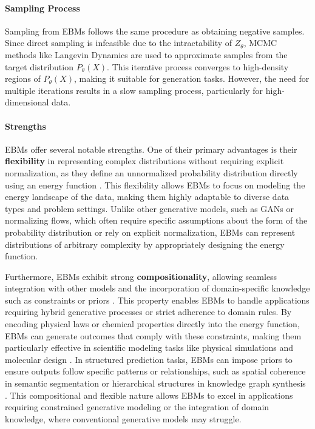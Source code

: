 \paragraph{Sampling Process}

Sampling from EBMs follows the same procedure as obtaining negative samples. Since direct sampling is infeasible due to the intractability of \( Z_\theta \), MCMC methods like Langevin Dynamics are used to approximate samples from the target distribution \( P_\theta(X) \). This iterative process converges to high-density regions of \( P_\theta(X) \), making it suitable for generation tasks. However, the need for multiple iterations results in a slow sampling process, particularly for high-dimensional data.

\paragraph{Strengths}

EBMs offer several notable strengths. One of their primary advantages is their \textbf{flexibility} in representing complex distributions without requiring explicit normalization, as they define an unnormalized probability distribution directly using an energy function \cite{lecun2006tutorial}. This flexibility allows EBMs to focus on modeling the energy landscape of the data, making them highly adaptable to diverse data types and problem settings. Unlike other generative models, such as GANs or normalizing flows, which often require specific assumptions about the form of the probability distribution or rely on explicit normalization, EBMs can represent distributions of arbitrary complexity by appropriately designing the energy function.

Furthermore, EBMs exhibit strong \textbf{compositionality}, allowing seamless integration with other models and the incorporation of domain-specific knowledge such as constraints or priors \cite{du2019implicit, grathwohl2020your}. This property enables EBMs to handle applications requiring hybrid generative processes or strict adherence to domain rules. By encoding physical laws or chemical properties directly into the energy function, EBMs can generate outcomes that comply with these constraints, making them particularly effective in scientific modeling tasks like physical simulations and molecular design \cite{du2019implicit}. In structured prediction tasks, EBMs can impose priors to ensure outputs follow specific patterns or relationships, such as spatial coherence in semantic segmentation or hierarchical structures in knowledge graph synthesis \cite{grathwohl2020your, lecun2006tutorial}. This compositional and flexible nature allows EBMs to excel in applications requiring constrained generative modeling or the integration of domain knowledge, where conventional generative models may struggle.

